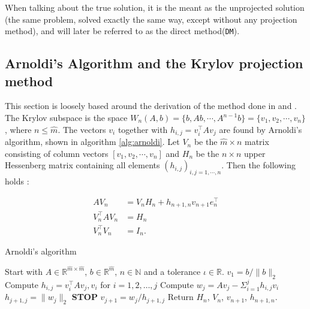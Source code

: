 \noindent When talking about the true solution, it is the meant as the unprojected solution (the same problem, solved exactly the same way, except without any projection method), and will later be referred to as the direct method(\texttt{DM}).
\subsection{Arnoldi's Algorithm and the Krylov projection method} %
This section is loosely based around the derivation of the method done in \cite{elena} and \cite{min}. \\

\noindent The Krylov subspace is the space $W_n (A,b) = \{b,Ab, \cdots, A^{n-1}b\} = \{v_1,v_2,\cdots,v_n\} $, where $n \leq \hat{m}$.
The vectors $v_i$ together with $h_{i,j} = v_i^\top Av_j$ are found by Arnoldi's algorithm, shown in algorithm \ref{alg:arnoldi}. Let $V_n$ be the $\hat{m} \times n$ matrix consisting of column vectors $[v_1,v_2,\cdots,v_n ] $ and $H_n$ be the $n \times n$ upper Hessenberg matrix containing all elements $(h_{i,j})_{i,j=1,\cdots,n}$. Then the following holds \cite{kryprop}:

\begin{equation}
\begin{aligned}
AV_n & = V_n H_n + h_{n+1,n}v_{n+1}e^\top_n  \\
V^{\top}_n AV_n &= H_n  \\
V_n^{\top} V_n &= I_n. 
\label{eqn:propA}
\end{aligned}
\end{equation}

\begin{algorithm} [h!]
\begin{algorithmic} \caption{Arnoldi's algorithm\cite{arnold}} \label{alg:arnoldi}  
\STATE Start with $A \in \mathbb{R}^{\hat{m} \times \hat{m}}$, $b \in \mathbb{R}^{\hat{m}}$, $n \in \mathbb{N}$ and a tolerance $\iota \in \mathbb{R}$.
\STATE $v_1 = b/\|b \|_2$
   \STATE Compute $h_{i,j} =  v_i^{\top}Av_j,v_i $ for $i = 1,2,\dots, j$
    \STATE Compute $w_j = A v_j - \Sigma_{i=1}^{j} h_{i,j}v_i $
    \STATE $h_{j+1,j} = \| w_j \|_2$
        \STATE\textbf{STOP}
    \ENDIF 
   \STATE $v_{j+1} = w_j/h_{j+1,j}$
\ENDFOR
\STATE Return $H_n$, $V_n$, $v_{n+1}$, $h_{n+1,n}$.
\end{algorithmic} 
\end{algorithm}



